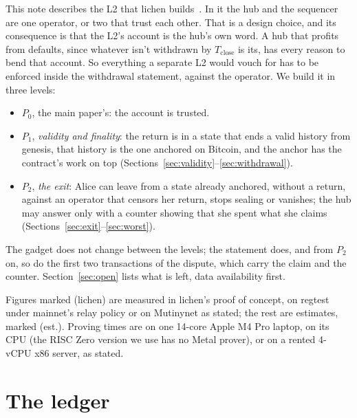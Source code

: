 \documentclass[11pt]{article}
\newcommand{\Tc}{T_{\mathrm{close}}}
\begin{document}
This note describes the L2 that lichen builds~\cite{lichencode}. In it
the hub and the sequencer are one operator, or two that trust each
other. That is a design choice, and its consequence is that the L2's
account is the hub's own word. A hub that profits from
defaults, since whatever isn't withdrawn by $\Tc$ is its, has every
reason to bend that account. So everything a separate L2 would vouch for
has to be enforced inside the withdrawal statement, against the
operator. We build it in three levels:
\begin{itemize}[leftmargin=1.5em]
\item $P_0$, the main paper's: the account is trusted.
\item $P_1$, \emph{validity and finality}: the return is in a state that
  ends a valid history from genesis, that history is the one anchored on
  Bitcoin, and the anchor has the contract's work on top
  (Sections~\ref{sec:validity}--\ref{sec:withdrawal}).
\item $P_2$, \emph{the exit}: Alice can leave from a state already
  anchored, without a return, against an operator that censors her
  return, stops sealing or vanishes; the hub may answer only with a
  counter showing that she spent what she claims
  (Sections~\ref{sec:exit}--\ref{sec:worst}).
\end{itemize}
The gadget does not change between the levels; the statement does, and
from $P_2$ on, so do the first two transactions of the dispute, which
carry the claim and the counter. Section~\ref{sec:open} lists what is
left, data availability first.

Figures marked (lichen) are measured in lichen's proof of concept, on
regtest under mainnet's relay policy or on Mutinynet as stated; the rest
are estimates, marked (est.). Proving times are on one 14-core Apple M4
Pro laptop, on its CPU (the RISC Zero version we use has no Metal
prover), or on a rented 4-vCPU x86 server, as stated.

\section{The ledger}
\label{sec:ledger}
\end{document}
